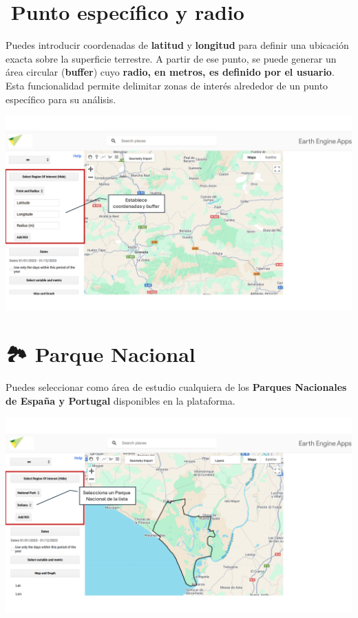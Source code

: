 \documentclass[
]{book}
\begin{document}
\section{\texorpdfstring{\textbf{📌Punto específico y radio}}{📌Punto específico y radio}}\label{punto-especuxedfico-y-radio}

Puedes introducir coordenadas de \textbf{latitud} y \textbf{longitud} para definir una ubicación exacta sobre la superficie terrestre. A partir de ese punto, se puede generar un área circular (\textbf{buffer}) cuyo \textbf{radio, en metros, es definido por el usuario}. Esta funcionalidad permite delimitar zonas de interés alrededor de un punto específico para su análisis.

\includegraphics{assets/buffer_es.png}

\section{\texorpdfstring{\textbf{🏞️ Parque Nacional}}{🏞️ Parque Nacional}}\label{parque-nacional}

Puedes seleccionar como área de estudio cualquiera de los \textbf{Parques Nacionales de España y Portugal} disponibles en la plataforma.

\includegraphics{assets/np_es.png}
\end{document}
